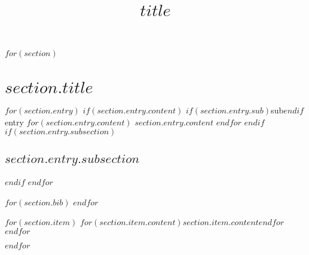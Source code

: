 \documentclass[a4paper]{moderncv}
\title{$title$}
\begin{document}
\maketitle
\nocite{*}

$for(section)$
\section{$section.title$}

$for(section.entry)$
  $if(section.entry.content)$
    \cv$if(section.entry.sub)$sub$endif$entry
    $for(section.entry.content)$ {$section.entry.content$} $endfor$
  $endif$
  $if(section.entry.subsection)$\subsection{$section.entry.subsection$}$endif$
$endfor$

$for(section.bib)$
\printbibliography[title={$section.bib.title$}, keyword=$section.bib.key$, heading=subbibliography]
$endfor$

$for(section.item)$
\cvitem
$for(section.item.content)${$section.item.content$}$endfor$
$endfor$

$endfor$
\end{document}
